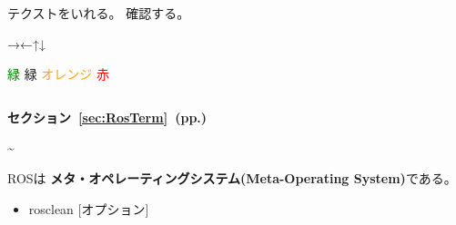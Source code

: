 \setcounter{num}{0}

\vspace{\baselineskip}
\noindent
{}
\thenum


\setcounter{num}{0}
\vspace{\baselineskip}
\noindent
{}\circled{\thenum} テクストをいれる。
\circled{\thenum} 確認する。


→←↑↓

\textcolor{green}{緑}
{\color{limegreen}緑}
\textcolor{orange}{オレンジ}
\textcolor{red}{赤}


\vspace{\baselineskip}
\begin{lstlisting}[language=ROS]
%*〜省略〜*)
\end{lstlisting}



\begin{exercise}[ROSシェルコマンドを使用できる環境]
\end{exercise}

\cite{book_key}

\textbf{セクション~\ref{sec:RosTerm}~(pp.\pageref{sec:RosTerm})}

\textasciitilde

\begin{center}
ROSは \textbf{メタ・オペレーティングシステム(Meta-Operating System)}である。
\end{center}

\begin{itemize}
\item  rosclean [オプション]
\end{itemize}

\vspace{\baselineskip}
\noindent
\begin{description}
\item[]
\end{description}

